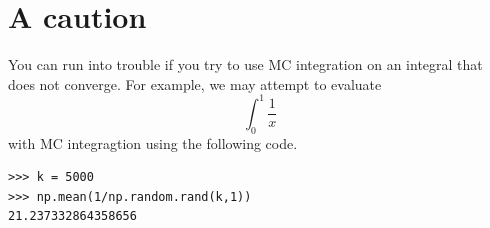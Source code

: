 \section*{A caution}
You can run into trouble if you try to use MC integration on an integral that does not converge.
For example, we may attempt to evaluate
\[
\int_0^1 \frac{1}{x}
\]
with MC integragtion using the following code.
\begin{lstlisting}
>>> k = 5000
>>> np.mean(1/np.random.rand(k,1))
21.237332864358656
\end{lstlisting}

